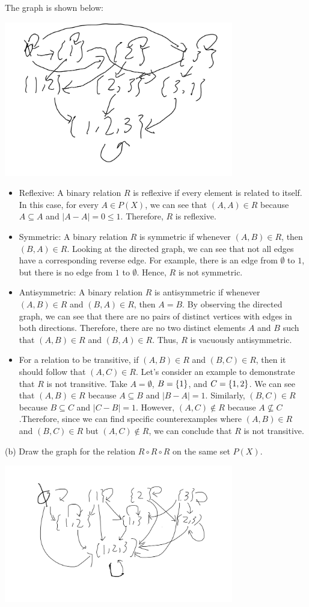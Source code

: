 \documentclass[11pt]{article}
\begin{document}
The graph is shown below:

\includegraphics[width=10cm]{6a.png}

\begin{itemize}
    \item Reflexive: A binary relation $R$ is reflexive if every element is related to itself. In this case, for every $A \in P(X)$, we can see that $(A, A) \in R$ because $A \subseteq A$ and $|A - A| = 0 \le 1$. Therefore, $R$ is reflexive.
    \item Symmetric: A binary relation $R$ is symmetric if whenever $(A, B) \in R$, then $(B, A) \in R$. Looking at the directed graph, we can see that not all edges have a corresponding reverse edge. For example, there is an edge from $\emptyset$ to ${1}$, but there is no edge from ${1}$ to $\emptyset$. Hence, $R$ is not symmetric.
    \item Antisymmetric: A binary relation $R$ is antisymmetric if whenever $(A, B) \in R$ and $(B, A) \in R$, then $A = B$. By observing the directed graph, we can see that there are no pairs of distinct vertices with edges in both directions. Therefore, there are no two distinct elements $A$ and $B$ such that $(A, B) \in R$ and $(B, A) \in R$. Thus, $R$ is vacuously antisymmetric.
    \item For a relation to be transitive, if $(A, B) \in R$ and $(B, C) \in R$, then it should follow that $(A, C) \in R$. Let's consider an example to demonstrate that $R$ is not transitive. Take $A = \emptyset$, $B = \{1\}$, and $C = \{1, 2\}$. We can see that $(A, B) \in R$ because $A \subseteq B$ and $|B - A| = 1$. Similarly, $(B, C) \in R$ because $B \subseteq C$ and $|C - B| = 1$. However, $(A, C) \notin R$ because $A \nsubseteq C$.Therefore, since we can find specific counterexamples where $(A, B) \in R$ and $(B, C) \in R$ but $(A, C) \notin R$, we can conclude that $R$ is not transitive.
\end{itemize}

(b) Draw the graph for the relation $R\circ R\circ R$ on the same set $P(X)$.

\solution

\includegraphics[width=10cm]{6b.png}
\end{document}
